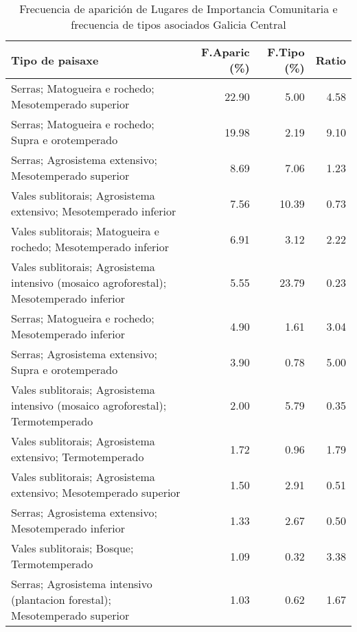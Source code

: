 \begin{table}[p]
\centering
\caption{Frecuencia de aparición de Lugares de Importancia Comunitaria e frecuencia de tipos asociados Galicia Central} 
\label{vnatura7}
\begin{tabular}{lrrr}
  \hline
Tipo de paisaxe & F.Aparic (\%) & F.Tipo (\%) & Ratio \\ 
  \hline
Serras; Matogueira e rochedo; Mesotemperado superior & 22.90 & 5.00 & 4.58 \\ 
  Serras; Matogueira e rochedo; Supra e orotemperado & 19.98 & 2.19 & 9.10 \\ 
  Serras; Agrosistema extensivo; Mesotemperado superior & 8.69 & 7.06 & 1.23 \\ 
  Vales sublitorais; Agrosistema extensivo; Mesotemperado inferior & 7.56 & 10.39 & 0.73 \\ 
  Vales sublitorais; Matogueira e rochedo; Mesotemperado inferior & 6.91 & 3.12 & 2.22 \\ 
  Vales sublitorais; Agrosistema intensivo (mosaico agroforestal); Mesotemperado inferior & 5.55 & 23.79 & 0.23 \\ 
  Serras; Matogueira e rochedo; Mesotemperado inferior & 4.90 & 1.61 & 3.04 \\ 
  Serras; Agrosistema extensivo; Supra e orotemperado & 3.90 & 0.78 & 5.00 \\ 
  Vales sublitorais; Agrosistema intensivo (mosaico agroforestal); Termotemperado & 2.00 & 5.79 & 0.35 \\ 
  Vales sublitorais; Agrosistema extensivo; Termotemperado & 1.72 & 0.96 & 1.79 \\ 
  Vales sublitorais; Agrosistema extensivo; Mesotemperado superior & 1.50 & 2.91 & 0.51 \\ 
  Serras; Agrosistema extensivo; Mesotemperado inferior & 1.33 & 2.67 & 0.50 \\ 
  Vales sublitorais; Bosque; Termotemperado & 1.09 & 0.32 & 3.38 \\ 
  Serras; Agrosistema intensivo (plantacion forestal); Mesotemperado superior & 1.03 & 0.62 & 1.67 \\ 
   \hline
\end{tabular}
\end{table}
